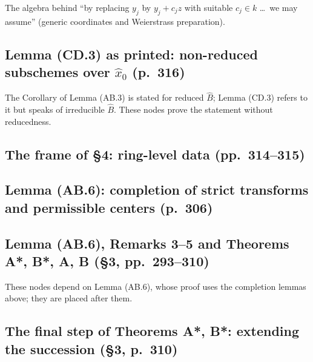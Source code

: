 The algebra behind ``by replacing $y_j$ by $y_j+c_jz$ with suitable $c_j\in k$ \dots\ we may
assume'' (generic coordinates and Weierstrass preparation).


\subsection*{Lemma (CD.3) as printed: non-reduced subschemes over $\hat x_0$ (p.~316)}

The Corollary of Lemma (AB.3) is stated for reduced $\hat B$; Lemma (CD.3) refers to it but speaks of
irreducible $\hat B$. These nodes prove the statement without reducedness.


\subsection*{The frame of \S4: ring-level data (pp.~314--315)}


\subsection*{Lemma (AB.6): completion of strict transforms and permissible centers (p.~306)}


\subsection*{Lemma (AB.6), Remarks 3--5 and Theorems A*, B*, A, B (\S3, pp.~293--310)}

These nodes depend on Lemma (AB.6), whose proof uses the completion lemmas above; they are placed
after them.


\subsection*{The final step of Theorems A*, B*: extending the succession (\S3, p.~310)}



